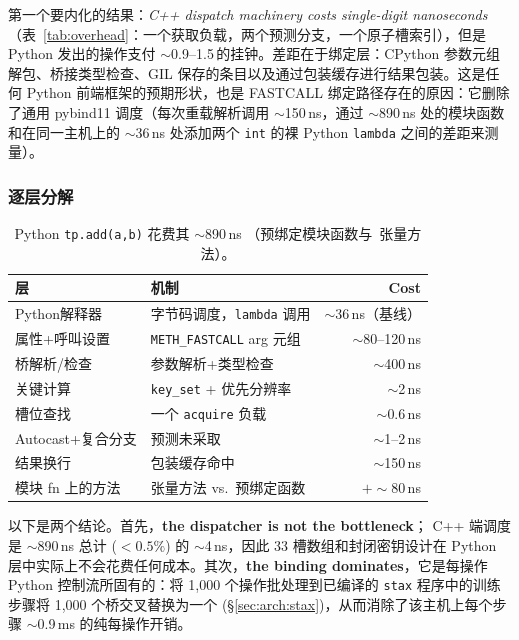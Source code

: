 第一个要内化的结果：\emph{C++ dispatch machinery costs single-digit nanoseconds}（表~\ref{tab:overhead}：一个获取负载，两个预测分支，一个原子槽索引），但是 Python 发出的操作支付 $\sim$0.9--1.5\,\textmu 的挂钟。差距在于绑定层：CPython 参数元组解包、桥接类型检查、GIL 保存的条目以及通过包装缓存进行结果包装。这是任何 Python 前端框架的预期形状，也是 FASTCALL 绑定路径存在的原因：它删除了通用 pybind11 调度（每次重载解析调用 $\sim$150\,ns，通过 $\sim$890\,ns 处的模块函数和在同一主机上的 $\sim$36\,ns 处添加两个 \texttt{int} 的裸 Python \texttt{lambda} 之间的差距来测量）。

\subsubsection{逐层分解}

\begin{table}[H]
\centering
\caption{Python \texttt{tp.add(a,b)} 花费其 $\sim$890\,ns （预绑定模块函数与\ 张量方法）。}
\label{tab:microbench-decomp}
\small
\begin{tabular}{llr}
\toprule
层 & 机制 & Cost \\
\midrule
Python解释器 & 字节码调度，\texttt{lambda} 调用 & $\sim$36\,ns（基线） \\
属性+呼叫设置 & \texttt{METH\_FASTCALL} arg 元组 & $\sim$80--120\,ns \\
桥解析/检查 & 参数解析+类型检查 & $\sim$400\,ns \\
关键计算 & \texttt{key\_set} + 优先分辨率 & $\sim$2\,ns \\
槽位查找 & 一个 \texttt{acquire} 负载 & $\sim$0.6\,ns \\
Autocast+复合分支 & 预测未采取 & $\sim$1--2\,ns \\
结果换行 & 包装缓存命中 & $\sim$150\,ns \\
\midrule
模块 fn 上的方法 & 张量方法 vs.\ 预绑定函数 & $+\sim$80\,ns \\
\bottomrule
\end{tabular}
\end{table}

以下是两个结论。首先，\textbf{the dispatcher is not the bottleneck}； C++ 端调度是 $\sim$890\,ns 总计 ($<0.5\%$) 的 $\sim$4\,ns，因此 33 槽数组和封闭密钥设计在 Python 层中实际上不会花费任何成本。其次，\textbf{the binding dominates}，它是每操作 Python 控制流所固有的：将 1{,}000 个操作批处理到已编译的 \texttt{stax} 程序中的训练步骤将 1{,}000 个桥交叉替换为一个 (\S\ref{sec:arch:stax})，从而消除了该主机上每个步骤 $\sim$0.9\,ms 的纯每操作开销。

